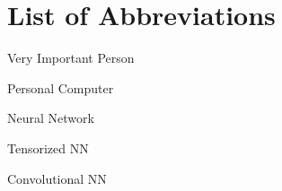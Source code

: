 \section{List of Abbreviations}

\begin{description}[leftmargin=!,labelwidth=2cm]
    \item [VIP] Very Important Person
    \item [PC] Personal Computer
    \item [NN] Neural Network
    \item [TNN] Tensorized NN
    \item [CNN] Convolutional NN

\end{description}